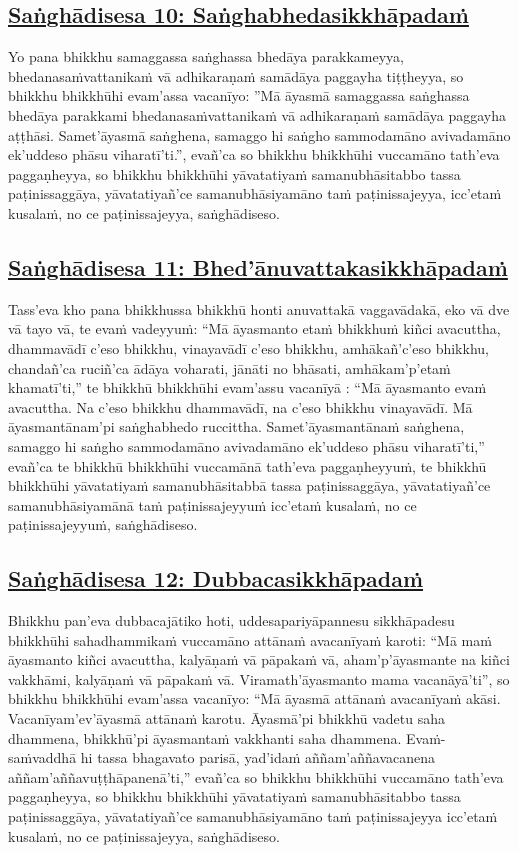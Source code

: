 \subsection*{\hyperref[comm10]{Saṅghādisesa 10: Saṅghabhedasikkhāpadaṁ}}
\label{sd10}
Yo pana bhikkhu samaggassa saṅghassa bhedāya parakkameyya, bhedanasaṁvattanikaṁ vā adhikaraṇaṁ samādāya paggayha tiṭṭheyya, so bhikkhu bhikkhūhi evam'assa vacanīyo: ''Mā āyasmā samaggassa saṅghassa bhedāya parakkami bhedanasaṁvattanikaṁ vā adhikaraṇaṁ samādāya paggayha aṭṭhāsi. Samet'āyasmā saṅghena, samaggo hi saṅgho sammodamāno avivadamāno ek'uddeso phāsu viharatī'ti.'', evañ'ca so bhikkhu bhikkhūhi vuccamāno tath'eva paggaṇheyya, so bhikkhu bhikkhūhi yāvatatiyaṁ samanubhāsitabbo tassa paṭinissaggāya, yāvatatiyañ'ce samanubhāsiyamāno taṁ paṭinissajeyya, icc'etaṁ kusalaṁ, no ce paṭinissajeyya, saṅghādiseso.

\subsection*{\hyperref[comm11]{Saṅghādisesa 11: Bhed'ānuvattakasikkhāpadaṁ}}
\label{sd11}
Tass'eva kho pana bhikkhussa bhikkhū honti anuvattakā vaggavādakā, eko vā dve vā tayo vā, te evaṁ vadeyyuṁ: ``Mā āyasmanto etaṁ bhikkhuṁ kiñci avacuttha, dhammavādī c'eso bhikkhu, vinayavādī c'eso bhikkhu, amhākañ'c'eso bhikkhu, chandañ'ca ruciñ'ca ādāya voharati, jānāti no bhāsati, amhākam'p'etaṁ khamatī'ti,'' te bhikkhū bhikkhūhi evam'assu vacanīyā : ``Mā āyasmanto evaṁ avacuttha. Na c'eso bhikkhu dhammavādī, na c'eso bhikkhu vinayavādī. Mā āyasmantānam'pi saṅghabhedo ruccittha. Samet'āyasmantānaṁ saṅghena, samaggo hi saṅgho sammodamāno avivadamāno ek'uddeso phāsu viharatī'ti,'' evañ'ca te bhikkhū bhikkhūhi vuccamānā tath'eva paggaṇheyyuṁ, te bhikkhū bhikkhūhi yāvatatiyaṁ samanubhāsitabbā tassa paṭinissaggāya, yāvatatiyañ'ce samanubhāsiyamānā taṁ paṭinissajeyyuṁ icc'etaṁ kusalaṁ, no ce paṭinissajeyyuṁ, saṅghādiseso.

\subsection*{\hyperref[comm12]{Saṅghādisesa 12: Dubbacasikkhāpadaṁ}}
\label{sd12}
Bhikkhu pan'eva dubbacajātiko hoti, uddesapariyāpannesu sikkhāpadesu bhikkhūhi sahadhammikaṁ vuccamāno attānaṁ avacanīyaṁ karoti: ``Mā maṁ āyasmanto kiñci avacuttha, kalyāṇaṁ vā pāpakaṁ vā, aham'p'āyasmante na kiñci vakkhāmi, kalyāṇaṁ vā pāpakaṁ vā. Viramath'āyasmanto mama vacanāyā'ti'', so bhikkhu bhikkhūhi evam'assa vacanīyo: ``Mā āyasmā attānaṁ avacanīyaṁ akāsi. Vacanīyam'ev'āyasmā attānaṁ karotu. Āyasmā'pi bhikkhū vadetu saha dhammena, bhikkhū'pi āyasmantaṁ vakkhanti saha dhammena. Evaṁ-saṁvaddhā hi tassa bhagavato parisā, yad'idaṁ aññam'aññavacanena aññam'aññavuṭṭhāpanenā'ti,'' evañ'ca so bhikkhu bhikkhūhi vuccamāno tath'eva paggaṇheyya, so bhikkhu bhikkhūhi yāvatatiyaṁ samanubhāsitabbo tassa paṭinissaggāya, yāvatatiyañ'ce samanubhāsiyamāno taṁ paṭinissajeyya icc'etaṁ kusalaṁ, no ce paṭinissajeyya, saṅghādiseso.

